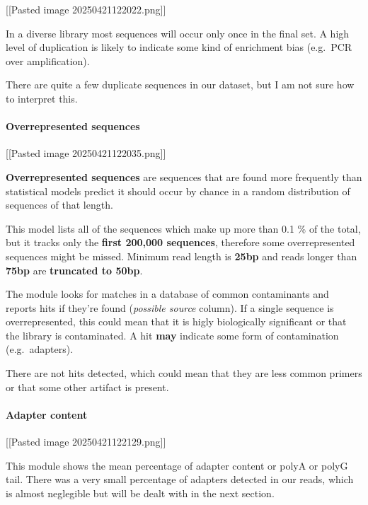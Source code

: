 {[}{[}Pasted image 20250421122022.png{]}{]}

In a diverse library most sequences will occur only once in the final
set. A high level of duplication is likely to indicate some kind of
enrichment bias (e.g.~PCR over amplification).

There are quite a few duplicate sequences in our dataset, but I am not
sure how to interpret this.

\hypertarget{overrepresented-sequences}{%
\paragraph{Overrepresented sequences}\label{overrepresented-sequences}}

{[}{[}Pasted image 20250421122035.png{]}{]}

\textbf{Overrepresented sequences} are sequences that are found more
frequently than statistical models predict it should occur by chance in
a random distribution of sequences of that length.

This model lists all of the sequences which make up more than 0.1 \% of
the total, but it tracks only the \textbf{first 200,000 sequences},
therefore some overrepresented sequences might be missed. Minimum read
length is \textbf{25bp} and reads longer than \textbf{75bp} are
\textbf{truncated to 50bp}.

The module looks for matches in a database of common contaminants and
reports hits if they're found (\emph{possible source} column). If a
single sequence is overrepresented, this could mean that it is higly
biologically significant or that the library is contaminated. A hit
\textbf{may} indicate some form of contamination (e.g.~adapters).

There are not hits detected, which could mean that they are less common
primers or that some other artifact is present.

\hypertarget{adapter-content}{%
\paragraph{Adapter content}\label{adapter-content}}

{[}{[}Pasted image 20250421122129.png{]}{]}

This module shows the mean percentage of adapter content or polyA or
polyG tail. There was a very small percentage of adapters detected in
our reads, which is almost neglegible but will be dealt with in the next
section.

